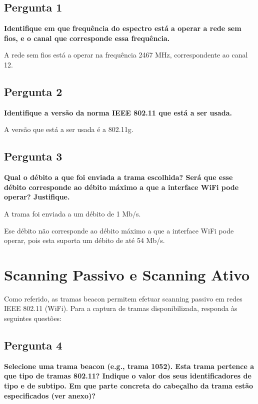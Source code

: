 \documentclass[11pt]{article}
\begin{document}
\subsection{Pergunta 1}

\textbf{Identifique em que frequência do espectro está a operar a rede sem fios, e o canal que corresponde essa frequência.}

A rede sem fios está a operar na frequência 2467 MHz, correspondente ao canal 12.

\subsection{Pergunta 2}

\textbf{Identifique a versão da norma IEEE 802.11 que está a ser usada.}

A versão que está a ser usada é a 802.11g.

\subsection{Pergunta 3}

\textbf{Qual o débito a que foi enviada a trama escolhida? Será que esse débito corresponde ao débito máximo a que a interface WiFi pode operar? Justifique.}

A trama foi enviada a um débito de 1 Mb/s.

Ese débito não corresponde ao débito máximo a que a interface WiFi pode operar, pois esta suporta um débito de até 54 Mb/s.


\clearpage
\section{Scanning Passivo e Scanning Ativo}

Como referido, as tramas beacon permitem efetuar scanning passivo em redes IEEE 802.11 (WiFi). Para a captura de tramas disponibilizada, responda às seguintes questões:

\vspace{0.5cm}

\subsection{Pergunta 4}

\textbf{Selecione uma trama beacon (e.g., trama 1052). Esta trama pertence a que tipo de tramas 802.11? Indique o valor dos seus identificadores de tipo e de subtipo. Em que parte concreta do cabeçalho da trama estão especificados (ver anexo)?}
\end{document}
